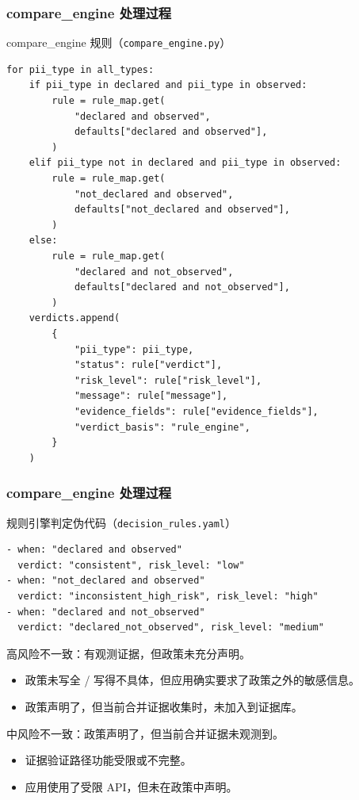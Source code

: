 \documentclass[AutoFakeBold,AutoFakeSlant]{beamer}
\begin{document}
\begin{frame}[fragile]
    \frametitle{compare\_engine 处理过程}
    \begin{block}{compare\_engine 规则（\texttt{compare\_engine.py}）}
    \scriptsize
    \begin{verbatim}
for pii_type in all_types:
    if pii_type in declared and pii_type in observed:
        rule = rule_map.get(
            "declared and observed",
            defaults["declared and observed"],
        )
    elif pii_type not in declared and pii_type in observed:
        rule = rule_map.get(
            "not_declared and observed",
            defaults["not_declared and observed"],
        )
    else:
        rule = rule_map.get(
            "declared and not_observed",
            defaults["declared and not_observed"],
        )
    verdicts.append(
        {
            "pii_type": pii_type,
            "status": rule["verdict"],
            "risk_level": rule["risk_level"],
            "message": rule["message"],
            "evidence_fields": rule["evidence_fields"],
            "verdict_basis": "rule_engine",
        }
    )
    \end{verbatim}
    \end{block}
\end{frame}


\begin{frame}[fragile]
    \frametitle{compare\_engine 处理过程}
    \begin{block}{规则引擎判定伪代码（\texttt{decision\_rules.yaml}）}
    \scriptsize
    \begin{verbatim}
- when: "declared and observed"
  verdict: "consistent", risk_level: "low"
- when: "not_declared and observed"
  verdict: "inconsistent_high_risk", risk_level: "high"
- when: "declared and not_observed"
  verdict: "declared_not_observed", risk_level: "medium"
    \end{verbatim}
    \end{block}
    高风险不一致：有观测证据，但政策未充分声明。\\
    \begin{itemize}
        \item 政策未写全 / 写得不具体，但应用确实要求了政策之外的敏感信息。
        \item 政策声明了，但当前合并证据收集时，未加入到证据库。
    \end{itemize}
    中风险不一致：政策声明了，但当前合并证据未观测到。\\
    \begin{itemize}
        \item 证据验证路径功能受限或不完整。
        \item 应用使用了受限 API，但未在政策中声明。
    \end{itemize}
\end{frame}
\end{document}
